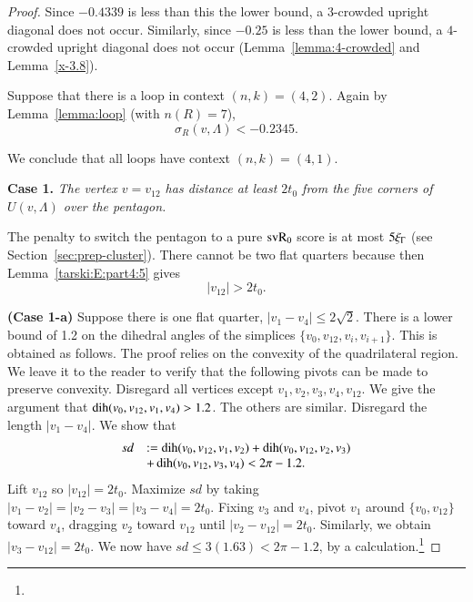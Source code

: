 \begin{proof}
Since $-0.4339$ is less than this the lower bound, a $3$-crowded
upright diagonal does not occur. Similarly, since $-0.25$ is less
than the lower bound, a $4$-crowded upright diagonal does not
occur (Lemma~\ref{lemma:4-crowded} and Lemma~\ref{x-3.8}).

Suppose that there is a loop in context $(n,k)=(4,2)$. Again by
Lemma~\ref{lemma:loop} (with $n(R)=7$),
$$\sigma_R(v,\Lambda)  < -0.2345.$$


We conclude that all loops have context $(n,k)=(4,1)$.


{\bf Case 1.}  {\it The vertex $v=v_{12}$ has distance at least
$2t_0$ from the five corners of $U(v,\Lambda)$ over the pentagon.}


The penalty to switch the pentagon to a pure ${\operatorname{svR}}_0$ score is at
most $5\xi_\Gamma$ (see Section~\ref{sec:prep-cluster}).  There cannot
be two flat quarters because then Lemma~\ref{tarski:E:part4:5} gives
$$|v_{12}|>2t_0.$$


{\bf (Case 1-a)} Suppose there is one flat quarter,
$|v_1-v_4|\le2\sqrt2$. There is a lower bound of 1.2 on the
dihedral angles of the simplices $\{v_0,v_{12},v_i,v_{i+1}\}$.  This
is obtained as follows.  The proof relies on the convexity of the
quadrilateral region.  We leave it to the reader to verify that
the following pivots can be made to preserve convexity.  Disregard
all vertices except $v_1,v_2,v_3,v_4,v_{12}$.  We give the
argument that $\operatorname{dih}(v_0,v_{12},v_1,v_4)>1.2$.  The others are
similar. Disregard the length $|v_1-v_4|$.  We show that
    $$
    \begin{array}{lll}
        sd &:=\operatorname{dih}(v_0,v_{12},v_1,v_2)+\operatorname{dih}(v_0,v_{12},v_2,v_3)\\
           &+\operatorname{dih}(v_0,v_{12},v_3,v_4) < 2\pi-1.2.
    \end{array}
    $$
Lift $v_{12}$ so $|v_{12}|=2t_0$. Maximize $sd$ by taking
$|v_1-v_2|=|v_2-v_3|=|v_3-v_4|=2t_0$.  Fixing $v_3$ and $v_4$,
pivot $v_1$ around $\{v_0,v_{12}\}$ toward $v_4$, dragging $v_2$
toward $v_{12}$ until $|v_2-v_{12}|=2t_0$.  Similarly, we obtain
$|v_3-v_{12}|=2t_0$. We now have $sd\le 3(1.63)< 2\pi-1.2$, by a
calculation.\footnote{}


\end{proof}

